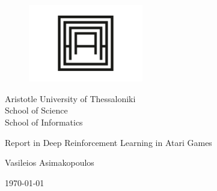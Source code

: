 \begin{titlepage}
	\afterpage{\blankpage}	
	\begin{figure}[H]
		\begin{center}
			\includegraphics[width=5cm]{Results/AUTH-01.jpg}
			\label{fig:cover_auth_logo}
		\end{center}
	\end{figure}
	
	\centering
	\Large Aristotle University of Thessaloniki \\
	\Large School of Science\\
	\large School of Informatics\\
	
	
	\vspace{\fill}
	
	\LARGE Report in Deep Reinforcement Learning in Atari Games
	
	\vspace{\fill}
	
	Vasileios Asimakopoulos
	
	
	
	\centering
	
	\today
	
\end{titlepage}
